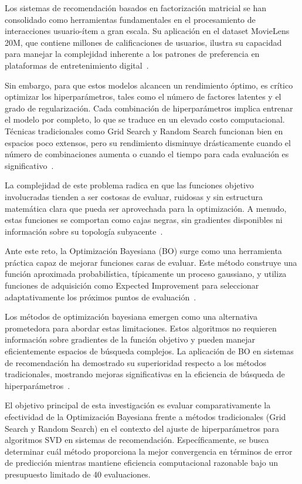 \documentclass[conference]{IEEEtran}
\begin{document}
Los sistemas de recomendación basados en factorización matricial se han consolidado como herramientas fundamentales en el procesamiento de interacciones usuario-ítem a gran escala. Su aplicación en el dataset MovieLens 20M, que contiene millones de calificaciones de usuarios, ilustra su capacidad para manejar la complejidad inherente a los patrones de preferencia en plataformas de entretenimiento digital~\cite{b2}.

Sin embargo, para que estos modelos alcancen un rendimiento óptimo, es crítico optimizar los hiperparámetros, tales como el número de factores latentes y el grado de regularización. Cada combinación de hiperparámetros implica entrenar el modelo por completo, lo que se traduce en un elevado costo computacional. Técnicas tradicionales como Grid Search y Random Search funcionan bien en espacios poco extensos, pero su rendimiento disminuye drásticamente cuando el número de combinaciones aumenta o cuando el tiempo para cada evaluación es significativo~\cite{b3}.

La complejidad de este problema radica en que las funciones objetivo involucradas tienden a ser costosas de evaluar, ruidosas y sin estructura matemática clara que pueda ser aprovechada para la optimización. A menudo, estas funciones se comportan como cajas negras, sin gradientes disponibles ni información sobre su topología subyacente~\cite{b4}.

Ante este reto, la Optimización Bayesiana (BO) surge como una herramienta práctica capaz de mejorar funciones caras de evaluar. Este método construye una función aproximada probabilística, típicamente un proceso gaussiano, y utiliza funciones de adquisición como Expected Improvement para seleccionar adaptativamente los próximos puntos de evaluación~\cite{b5}.

Los métodos de optimización bayesiana emergen como una alternativa prometedora para abordar estas limitaciones. Estos algoritmos no requieren información sobre gradientes de la función objetivo y pueden manejar eficientemente espacios de búsqueda complejos. La aplicación de BO en sistemas de recomendación ha demostrado su superioridad respecto a los métodos tradicionales, mostrando mejoras significativas en la eficiencia de búsqueda de hiperparámetros~\cite{b6}.

El objetivo principal de esta investigación es evaluar comparativamente la efectividad de la Optimización Bayesiana frente a métodos tradicionales (Grid Search y Random Search) en el contexto del ajuste de hiperparámetros para algoritmos SVD en sistemas de recomendación. Específicamente, se busca determinar cuál método proporciona la mejor convergencia en términos de error de predicción mientras mantiene eficiencia computacional razonable bajo un presupuesto limitado de 40 evaluaciones.
\end{document}
